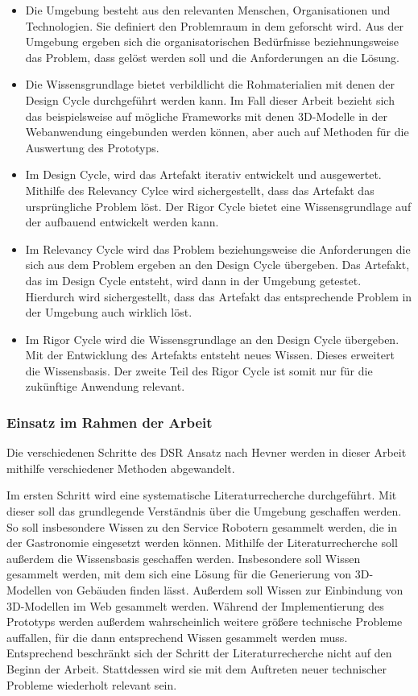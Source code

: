 \begin{itemize}
    \item Die Umgebung besteht aus den relevanten Menschen, Organisationen und Technologien. Sie definiert den Problemraum in dem geforscht wird. Aus der Umgebung ergeben sich die organisatorischen Bedürfnisse beziehnungsweise das Problem, dass gelöst werden soll und die Anforderungen an die Lösung.
    \item Die Wissensgrundlage bietet verbildlicht die Rohmaterialien mit denen der Design Cycle durchgeführt werden kann. Im Fall dieser Arbeit bezieht sich das beispielsweise auf mögliche Frameworks mit denen 3D-Modelle in der Webanwendung eingebunden werden können, aber auch auf Methoden für die Auswertung des Prototyps.
    \item Im Design Cycle, wird das Artefakt iterativ entwickelt und ausgewertet. Mithilfe des Relevancy Cylce wird sichergestellt, dass das Artefakt das ursprüngliche Problem löst. Der Rigor Cycle bietet eine Wissensgrundlage auf der aufbauend entwickelt werden kann.
    \item Im Relevancy Cycle wird das Problem beziehungsweise die Anforderungen die sich aus dem Problem ergeben an den Design Cycle übergeben. Das Artefakt, das im Design Cycle entsteht, wird dann in der Umgebung getestet. Hierdurch wird sichergestellt, dass das Artefakt das entsprechende Problem in der Umgebung auch wirklich löst.
    \item Im Rigor Cycle wird die Wissensgrundlage an den Design Cycle übergeben. Mit der Entwicklung des Artefakts entsteht neues Wissen. Dieses erweitert die Wissensbasis. Der zweite Teil des Rigor Cycle ist somit nur für die zukünftige Anwendung relevant.
\end{itemize}

\subsubsection{Einsatz im Rahmen der Arbeit}

Die verschiedenen Schritte des \ac{DSR} Ansatz nach Hevner werden in dieser Arbeit mithilfe verschiedener Methoden abgewandelt.

Im ersten Schritt wird eine systematische Literaturrecherche durchgeführt. Mit dieser soll das grundlegende Verständnis über die Umgebung geschaffen werden. So soll insbesondere Wissen zu den Service Robotern gesammelt werden, die in der Gastronomie eingesetzt werden können. Mithilfe der Literaturrecherche soll außerdem die Wissensbasis geschaffen werden. Insbesondere soll Wissen gesammelt werden, mit dem sich eine Lösung für die Generierung von 3D-Modellen von Gebäuden finden lässt. Außerdem soll Wissen zur Einbindung von 3D-Modellen im Web gesammelt werden. Während der Implementierung des Prototyps werden außerdem wahrscheinlich weitere größere technische Probleme auffallen, für die dann entsprechend Wissen gesammelt werden muss. Entsprechend beschränkt sich der Schritt der Literaturrecherche nicht auf den Beginn der Arbeit. Stattdessen wird sie mit dem Auftreten neuer technischer Probleme wiederholt relevant sein.

